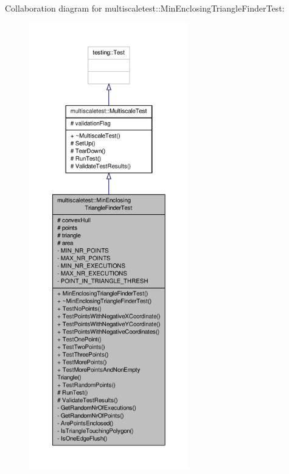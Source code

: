 Collaboration diagram for multiscaletest\-:\-:Min\-Enclosing\-Triangle\-Finder\-Test\-:\nopagebreak
\begin{figure}[H]
\begin{center}
\leavevmode
\includegraphics[height=550pt]{classmultiscaletest_1_1MinEnclosingTriangleFinderTest__coll__graph}
\end{center}
\end{figure}
